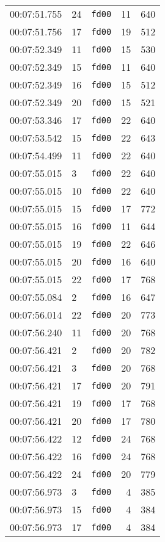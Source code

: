 \documentclass{article}
\begin{document}
\begin{longtable}{lllrr}
00:07:51.755 & 24 & \texttt{fd00} & 11 & 640 \\
00:07:51.756 & 17 & \texttt{fd00} & 19 & 512 \\
00:07:52.349 & 11 & \texttt{fd00} & 15 & 530 \\
00:07:52.349 & 15 & \texttt{fd00} & 11 & 640 \\
00:07:52.349 & 16 & \texttt{fd00} & 15 & 512 \\
00:07:52.349 & 20 & \texttt{fd00} & 15 & 521 \\
00:07:53.346 & 17 & \texttt{fd00} & 22 & 640 \\
00:07:53.542 & 15 & \texttt{fd00} & 22 & 643 \\
00:07:54.499 & 11 & \texttt{fd00} & 22 & 640 \\
00:07:55.015 & 3 & \texttt{fd00} & 22 & 640 \\
00:07:55.015 & 10 & \texttt{fd00} & 22 & 640 \\
00:07:55.015 & 15 & \texttt{fd00} & 17 & 772 \\
00:07:55.015 & 16 & \texttt{fd00} & 11 & 644 \\
00:07:55.015 & 19 & \texttt{fd00} & 22 & 646 \\
00:07:55.015 & 20 & \texttt{fd00} & 16 & 640 \\
00:07:55.015 & 22 & \texttt{fd00} & 17 & 768 \\
00:07:55.084 & 2 & \texttt{fd00} & 16 & 647 \\
00:07:56.014 & 22 & \texttt{fd00} & 20 & 773 \\
00:07:56.240 & 11 & \texttt{fd00} & 20 & 768 \\
00:07:56.421 & 2 & \texttt{fd00} & 20 & 782 \\
00:07:56.421 & 3 & \texttt{fd00} & 20 & 768 \\
00:07:56.421 & 17 & \texttt{fd00} & 20 & 791 \\
00:07:56.421 & 19 & \texttt{fd00} & 17 & 768 \\
00:07:56.421 & 20 & \texttt{fd00} & 17 & 780 \\
00:07:56.422 & 12 & \texttt{fd00} & 24 & 768 \\
00:07:56.422 & 16 & \texttt{fd00} & 24 & 768 \\
00:07:56.422 & 24 & \texttt{fd00} & 20 & 779 \\
00:07:56.973 & 3 & \texttt{fd00} & 4 & 385 \\
00:07:56.973 & 15 & \texttt{fd00} & 4 & 384 \\
00:07:56.973 & 17 & \texttt{fd00} & 4 & 384 \\

\end{longtable}
\end{document}
